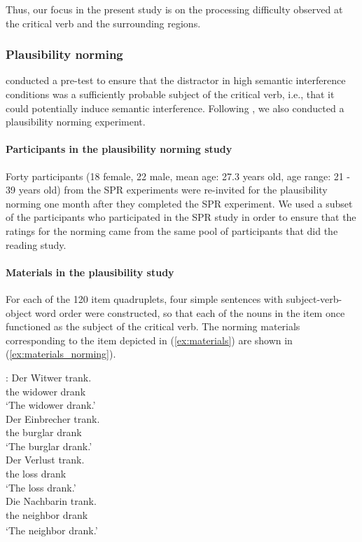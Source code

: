 \documentclass[a4paper, man, floatsintext]{apa7}
\begin{document}
Thus, our focus in the present study is on the processing difficulty observed at the critical verb and the surrounding regions.


\subsubsection{Plausibility norming}
\citeauthor{vandyke07} conducted a pre-test to ensure that the distractor in high semantic interference conditions was a sufficiently probable subject of the critical verb, i.e., that it could potentially induce semantic interference. Following \citeauthor{vandyke07}, we also conducted a plausibility norming experiment.

\paragraph{Participants in the plausibility norming study}
Forty participants (18 female, 22 male, mean age: 27.3 years old, age range: 21 - 39 years old) from the SPR experiments were re-invited for the plausibility norming one month after they completed the SPR experiment. We used a subset of the participants who participated in the SPR study in order to ensure that the ratings for the norming came from the same pool of participants that did the reading study.

\paragraph{Materials in the plausibility study}
For each of the 120 item quadruplets, four simple sentences with subject-verb-object word order were constructed, so that each of the nouns in the item once functioned as the subject of the critical verb. The norming materials corresponding to the item depicted in (\ref{ex:materials}) are shown in (\ref{ex:materials_norming}).

\begin{exe}  
\ex \label{ex:materials_norming}
    \begin{xlist}   
    :\label{ex:subject} 
    \gll Der Witwer trank. \\ 
    the widower drank\\
    \trans  `The widower drank.'\\  
    \label{ex:animate_dist} 
    \gll Der Einbrecher trank. \\ 
    the burglar drank \\
    \trans `The burglar drank.' \\
   \label{ex:inanimate_dist} 
    \gll Der Verlust trank.  \\ 
    the loss drank\\
    \trans  `The loss drank.'\\  
    \label{ex:intro_noun} 
    \gll Die Nachbarin trank.\\ 
    the\textsubscript{} neighbor\textsubscript{} drank \\
    \trans `The neighbor drank.' \\
    \end{xlist}
\end{exe}
\end{document}
